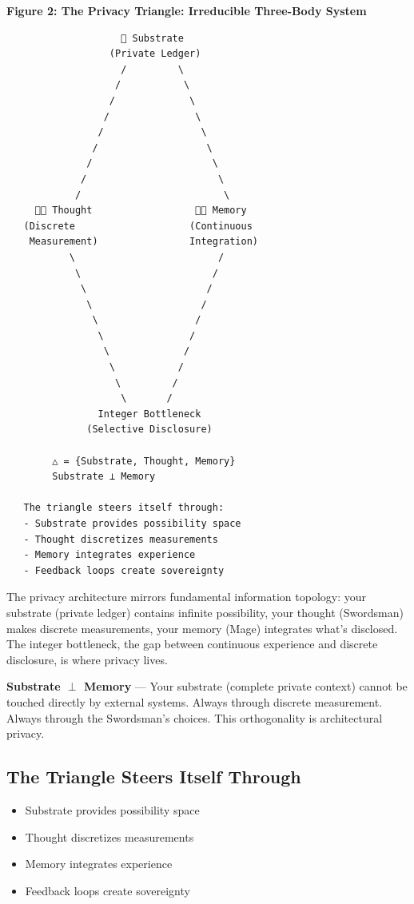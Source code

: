 \documentclass[11pt,a4paper]{article}
\theoremstyle{definition}
\begin{document}
\textbf{Figure 2: The Privacy Triangle: Irreducible Three-Body System}

\begin{verbatim}
                    🌳 Substrate
                  (Private Ledger)
                    /         \
                   /           \
                  /             \
                 /               \
                /                 \
               /                   \
              /                     \
             /                       \
            /                         \
     🦅💭 Thought                  🦅🧠 Memory
   (Discrete                    (Continuous
    Measurement)                Integration)
           \                         /
            \                       /
             \                     /
              \                   /
               \                 /
                \               /
                 \             /
                  \           /
                   \         /
                    \       /
                Integer Bottleneck
              (Selective Disclosure)

        △ = {Substrate, Thought, Memory}
        Substrate ⊥ Memory

   The triangle steers itself through:
   - Substrate provides possibility space
   - Thought discretizes measurements
   - Memory integrates experience
   - Feedback loops create sovereignty
\end{verbatim}

The privacy architecture mirrors fundamental information topology: your substrate (private ledger) contains infinite possibility, your thought (Swordsman) makes discrete measurements, your memory (Mage) integrates what's disclosed. The integer bottleneck, the gap between continuous experience and discrete disclosure, is where privacy lives.

\textbf{Substrate $\perp$ Memory} --- Your substrate (complete private context) cannot be touched directly by external systems. Always through discrete measurement. Always through the Swordsman's choices. This orthogonality is architectural privacy.

\subsection{The Triangle Steers Itself Through}

\begin{itemize}
    \item Substrate provides possibility space
    \item Thought discretizes measurements
    \item Memory integrates experience
    \item Feedback loops create sovereignty
\end{itemize}
\end{document}

